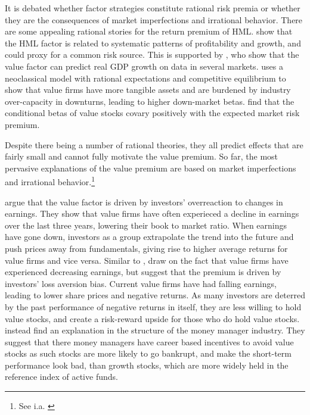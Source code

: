 It is debated whether factor strategies constitute rational risk premia or whether they are the consequences of market imperfections and irrational behavior. There are some appealing rational stories for the return premium of HML. \textcite{FamaFrench1993} show that the HML factor is related to systematic patterns of profitability and growth, and could proxy for a common risk source. This is supported by \textcite{LiewVassalou2000}, who show that the value factor can predict real GDP growth on data in several markets. \textcite{Zhang2005} uses a neoclassical model with rational expectations and competitive equilibrium to show that value firms have more tangible assets and are burdened by industry over-capacity in downturns, leading to higher down-market betas. \textcite{PetkovaZhang2005} find that the conditional betas of value stocks covary positively with the expected market risk premium.

Despite there being a number of rational theories, they all predict effects that are fairly small and cannot fully motivate the value premium. So far, the most pervasive explanations of the value premium are based on market imperfections and irrational behavior.\footnote{See i.a. \textcite{Ilmanen2011}}

\textcite{LakonishokShleiferVishny1994} argue that the value factor is driven by investors' overreaction to changes in earnings. They show that value firms have often experieced a decline in earnings over the last three years, lowering their book to market ratio. When earnings have gone down, investors as a group extrapolate the trend into the future and push prices away from fundamentals, giving rise to higher average returns for value firms and vice versa. Similar to \textcite{LakonishokShleiferVishny1994}, \textcite{BarberisHuang2001} draw on the fact that value firms have experienced decreasing earnings, but suggest that the premium is driven by investors' loss aversion bias. Current value firms have had falling earnings, leading to lower share prices and negative returns. As many investors are deterred by the past performance of negative returns in itself, they are less willing to hold value stocks, and create a risk-reward upside for those who do hold value stocks. \textcite{LakonishokShleiferVishny1992} instead find an explanation in the structure of the money manager industry. They suggest that there money managers have career based incentives to avoid value stocks as such stocks are more likely to go bankrupt, and make the short-term performance look bad, than growth stocks, which are more widely held in the reference index of active funds.

